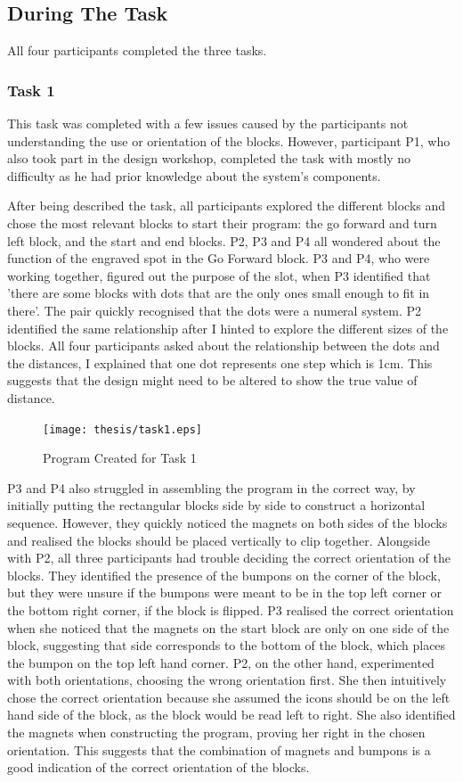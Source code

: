 \documentclass[oneside,%
                    author={Malak Hajji},
                    degree={BSc},
                    title={Designing An Accessible Computational Toolkit For Students},
                  subtitle={With Mixed Visual Abilities}]{dissertation}
\begin{document}
\subsection{During The Task}
All four participants completed the three tasks.
\subsubsection{Task 1}
This task was completed with a few issues caused by the participants not understanding the use or orientation of the blocks. However, participant P1, who also took part in the design workshop, completed the task with mostly no difficulty as he had prior knowledge about the system's components.

After being described the task, all participants explored the different blocks and chose the most relevant blocks to start their program: the go forward and turn left block, and the start and end blocks. 
P2, P3 and P4 all wondered about the function of the engraved spot in the Go Forward block. P3 and P4, who were working together, figured out the purpose of the slot, when P3 identified that 'there are some blocks with dots that are the only ones small enough to fit in there'. The pair quickly recognised that the dots were a numeral system. P2 identified the same relationship after I hinted to explore the different sizes of the blocks. All four participants asked about the relationship between the dots and the distances, I explained that one dot represents one step which is 1cm. This suggests that the design might need to be altered to show the true value of distance.
\FloatBarrier
\begin{figure}[h]
    \centering
    \texttt{[image: thesis/task1.eps]}
    \caption{Program Created for Task 1}
    \label{fig-task1}
\end{figure}
\FloatBarrier
P3 and P4 also struggled in assembling the program in the correct way, by initially putting the rectangular blocks side by side to construct a horizontal sequence. However, they quickly noticed the magnets on both sides of the blocks and realised the blocks should be placed vertically to clip together. Alongside with P2, all three participants had trouble deciding the correct orientation of the blocks. They identified the presence of the bumpons on the corner of the block, but they were unsure if the bumpons were meant to be in the top left corner or the bottom right corner, if the block is flipped. P3 realised the correct orientation when she noticed that the magnets on the start block are only on one side of the block, suggesting that side corresponds to the bottom of the block, which places the bumpon on the top left hand corner. P2, on the other hand, experimented with both orientations, choosing the wrong orientation first. She then intuitively chose the correct orientation because she assumed the icons should be on the left hand side of the block, as the block would be read left to right. She also identified the magnets when constructing the program, proving her right in the chosen orientation. This suggests that the combination of magnets and bumpons is a good indication of the correct orientation of the blocks. 
\end{document}
